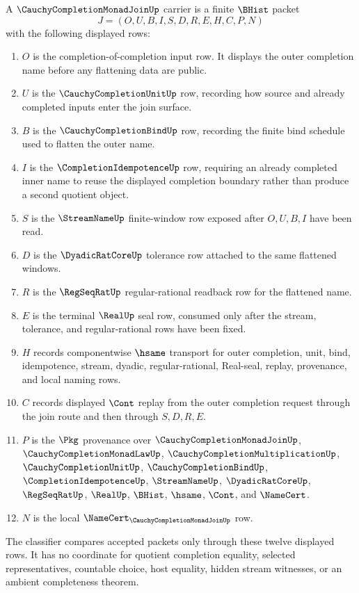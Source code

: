 \begin{definition}
\label{def:cauchy-completion-monad-join-carrier}
A $\CauchyCompletionMonadJoinUp$ carrier is a finite $\BHist$ packet
$$
J=(O,U,B,I,S,D,R,E,H,C,P,N)
$$
with the following displayed rows:
\begin{enumerate}
\item $O$ is the completion-of-completion input row. It displays the outer completion name before any flattening data are public.
\item $U$ is the $\CauchyCompletionUnitUp$ row, recording how source and already completed inputs enter the join surface.
\item $B$ is the $\CauchyCompletionBindUp$ row, recording the finite bind schedule used to flatten the outer name.
\item $I$ is the $\CompletionIdempotenceUp$ row, requiring an already completed inner name to reuse the displayed completion boundary rather than produce a second quotient object.
\item $S$ is the $\StreamNameUp$ finite-window row exposed after $O,U,B,I$ have been read.
\item $D$ is the $\DyadicRatCoreUp$ tolerance row attached to the same flattened windows.
\item $R$ is the $\RegSeqRatUp$ regular-rational readback row for the flattened name.
\item $E$ is the terminal $\RealUp$ seal row, consumed only after the stream, tolerance, and regular-rational rows have been fixed.
\item $H$ records componentwise $\hsame$ transport for outer completion, unit, bind, idempotence, stream, dyadic, regular-rational, Real-seal, replay, provenance, and local naming rows.
\item $C$ records displayed $\Cont$ replay from the outer completion request through the join route and then through $S,D,R,E$.
\item $P$ is the $\Pkg$ provenance over $\CauchyCompletionMonadJoinUp$, $\CauchyCompletionMonadLawUp$, $\CauchyCompletionMultiplicationUp$, $\CauchyCompletionUnitUp$, $\CauchyCompletionBindUp$, $\CompletionIdempotenceUp$, $\StreamNameUp$, $\DyadicRatCoreUp$, $\RegSeqRatUp$, $\RealUp$, $\BHist$, $\hsame$, $\Cont$, and $\NameCert$.
\item $N$ is the local $\NameCert_{\CauchyCompletionMonadJoinUp}$ row.
\end{enumerate}
The classifier compares accepted packets only through these twelve displayed rows. It has no coordinate for quotient completion equality, selected representatives, countable choice, host equality, hidden stream witnesses, or an ambient completeness theorem.
\end{definition}

